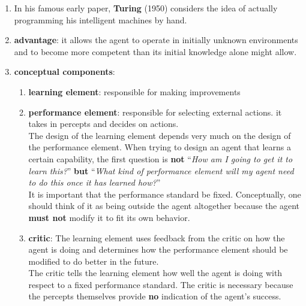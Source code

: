 \begin{enumerate}[itemsep=0.2cm]
    \item In his famous early paper, \textbf{Turing} (1950) considers the idea of actually programming his intelligent machines by hand.
    \hfill \cite{ai/book/Artificial-Intelligence-A-Modern-Approach/Russell-Norvig}

    \item  \textbf{advantage}: it allows the agent to operate in initially unknown environments and to become more competent than its initial knowledge alone might allow.
    \hfill \cite{ai/book/Artificial-Intelligence-A-Modern-Approach/Russell-Norvig}

    \item \textbf{conceptual components}:
    \begin{enumerate}[itemsep=0.1cm]
        \item \textbf{learning element}: responsible for making improvements
        \hfill \cite{ai/book/Artificial-Intelligence-A-Modern-Approach/Russell-Norvig}

        \item \textbf{performance element}: responsible for selecting external actions. it takes in percepts and decides on actions.
        \hfill \cite{ai/book/Artificial-Intelligence-A-Modern-Approach/Russell-Norvig}
        \\
        The design of the learning element depends very much on the design of the performance element. When trying to design an agent that learns a certain capability, the first question is \textbf{not} “\textit{How am I going to get it to learn this?}” \textbf{but} “\textit{What kind of performance element will my agent need to do this once it has learned how?}”
        \hfill \cite{ai/book/Artificial-Intelligence-A-Modern-Approach/Russell-Norvig}
        \\
        It is important that the performance standard be fixed. Conceptually, one should think of it as being outside the agent altogether because the agent \textbf{must not} modify it to fit its own behavior.
        \hfill \cite{ai/book/Artificial-Intelligence-A-Modern-Approach/Russell-Norvig}

        \item \textbf{critic}: The learning element uses feedback from the critic on how the agent is doing and determines how the performance element should be modified to do better in the future. 
        \hfill \cite{ai/book/Artificial-Intelligence-A-Modern-Approach/Russell-Norvig}
        \\
        The critic tells the learning element how well the agent is doing with respect to a fixed performance standard. The critic is necessary because the percepts themselves provide \textbf{no} indication of the agent’s success.
        \hfill \cite{ai/book/Artificial-Intelligence-A-Modern-Approach/Russell-Norvig}


\end{enumerate}
\end{enumerate}
